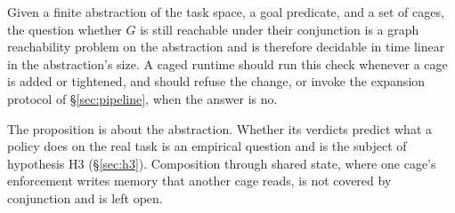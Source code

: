 \begin{proposition}
\label{prop:check}
Given a finite abstraction of the task space, a goal predicate, and a set of cages, the question whether $G$ is still reachable under their conjunction is a graph reachability problem on the abstraction and is therefore decidable in time linear in the abstraction's size. A caged runtime should run this check whenever a cage is added or tightened, and should refuse the change, or invoke the expansion protocol of \S\ref{sec:pipeline}, when the answer is no.
\end{proposition}

The proposition is about the abstraction. Whether its verdicts predict what a policy does on the real task is an empirical question and is the subject of hypothesis H3 (\S\ref{sec:h3}). Composition through shared state, where one cage's enforcement writes memory that another cage reads, is not covered by conjunction and is left open.

